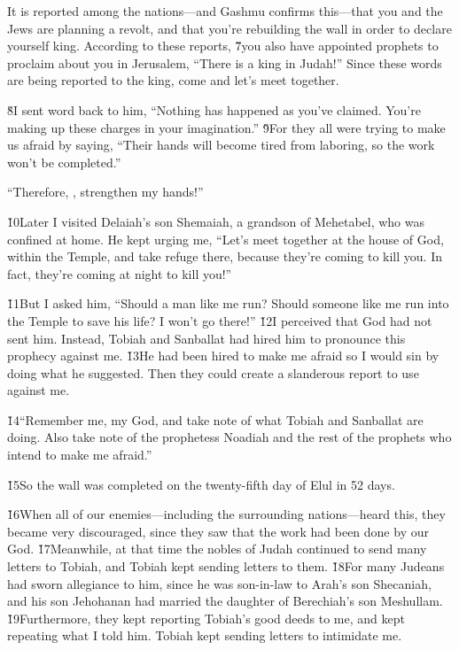 \begin{poetry}
\poeml It is reported among the nations---and Gashmu confirms this---that you and the Jews are planning a revolt, and that you're rebuilding the wall in order to declare yourself king. According to these reports, \v{7}you also have appointed prophets to proclaim about you in Jerusalem, ``There is a king in Judah!'' Since these words are being reported to the king, come and let's meet together.
\end{poetry}

\v{8}I sent word back to him, ``Nothing has happened as you've claimed. You're making up these charges in your imagination.'' \v{9}For they all were trying to make us afraid by saying, ``Their hands will become tired from laboring, so the work won't be completed.''

``Therefore, , strengthen my hands!''

\v{10}Later I visited Delaiah's son Shemaiah, a grandson of Mehetabel, who was confined at home. He kept urging me, ``Let's meet together at the house of God, within the Temple, and take refuge there, because they're coming to kill you. In fact, they're coming at night to kill you!''

\v{11}But I asked him, ``Should a man like me run? Should someone like me run into the Temple to save his life? I won't go there!'' \v{12}I perceived that God had not sent him. Instead, Tobiah and Sanballat had hired him to pronounce this prophecy against me. \v{13}He had been hired to make me afraid so I would sin by doing what he suggested. Then they could create a slanderous report to use against me.

\v{14}``Remember me, my God, and take note of what Tobiah and Sanballat are doing. Also take note of the prophetess Noadiah and the rest of the prophets who intend to make me afraid.''

\v{15}So the wall was completed on the twenty-fifth day of Elul in 52 days.

\v{16}When all of our enemies---including the surrounding nations---heard this, they became very discouraged, since they saw that the work had been done by our God. \v{17}Meanwhile, at that time the nobles of Judah continued to send many letters to Tobiah, and Tobiah kept sending letters to them. \v{18}For many Judeans had sworn allegiance to him, since he was son-in-law to Arah's son Shecaniah, and his son Jehohanan had married the daughter of Berechiah's son Meshullam. \v{19}Furthermore, they kept reporting Tobiah's good deeds to me, and kept repeating what I told him. Tobiah kept sending letters to intimidate me.

